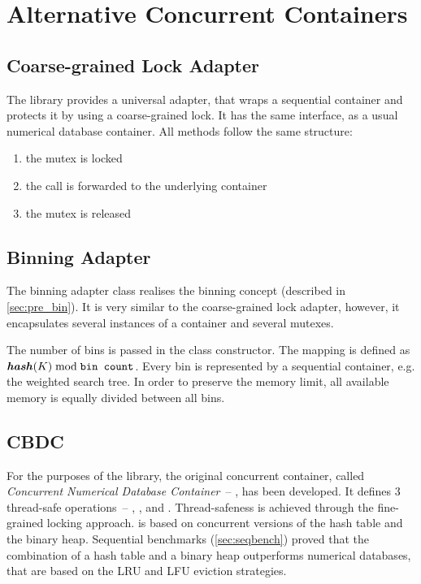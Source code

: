 \section{Alternative Concurrent Containers}
\label{sec:concurrent_containers}
\subsection{Coarse-grained Lock Adapter}
The \numdbname library provides a universal adapter, that wraps a sequential container and protects it by using a coarse-grained lock. It has the same interface, as a usual numerical database container. All methods follow the same structure:
\begin{enumerate}
\item the mutex is locked
\item the call is forwarded to the underlying container
\item the mutex is released
\end{enumerate}

\subsection{Binning Adapter}
The binning adapter class realises the binning concept (described in \cref{sec:pre_bin}). It is very similar to the coarse-grained lock adapter, however, it encapsulates several instances of a container and several mutexes.

The number of bins is passed in the class constructor. The mapping is defined as  $\textbf{\textit{hash}}(K)\bmod \texttt{bin count}$. Every bin is represented by a sequential container, e.g. the weighted search tree. In order to preserve the memory limit, all available memory is equally divided between all bins.

\subsection{CBDC}
For the purposes of the \numdbname library, the original concurrent container, called \emph{Concurrent Numerical Database Container}~-- \cndcname, has been developed. It defines 3 thread-safe operations~-- \findop, \insertop, and . Thread-safeness is achieved through the fine-grained locking approach. \cndcname is based on concurrent versions of the hash table and the binary heap. Sequential benchmarks (\cref{sec:seqbench}) proved that the combination of a hash table and a binary heap outperforms numerical databases, that are based on the LRU and LFU eviction strategies.

